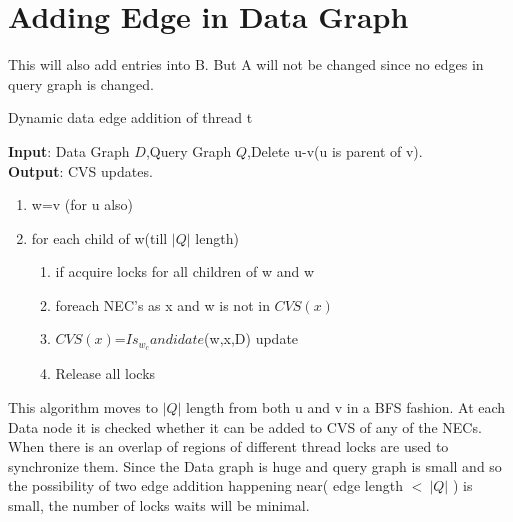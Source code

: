 \section{Adding Edge in Data Graph}
 \label{sec:ad}
	\hspace{10mm} This will also add entries into B. But A will not be changed since no edges in query graph is changed. 
	\begin{algorithm}[H]
\caption{Dynamic data edge addition of thread t}
\textbf{Input}: Data Graph $D$,Query Graph $Q$,Delete u-v(u is parent of v).\\
\textbf{Output}: CVS updates.\\
\begin{algorithmic}
 \item \begin{enumerate}
 \item w=v (for u also)
\item for each child of w(till $|Q|$ length)
\begin{enumerate}
\item if acquire locks for all children of w and w 
\item foreach NEC's as x and w is not in $CVS(x)$
\item \hspace{10mm}$CVS(x)$=$Is_w_candidate$(w,x,D) update
\item Release all locks
\end{enumerate}
\end{enumerate}
\end{algorithmic}
\label{alg:adddataedge}
\end{algorithm}
\hspace{10mm} This algorithm moves to  $|Q|$ length from both u and v in a BFS fashion. At each Data node it is checked whether it can be added to CVS of any of the NECs. When there is an overlap of regions of different thread locks are used to synchronize them. Since the Data graph is huge and  query graph is small and so the possibility of two edge addition happening near( edge length  $< ~|Q|$ ) is small, the number of locks waits will be minimal.
